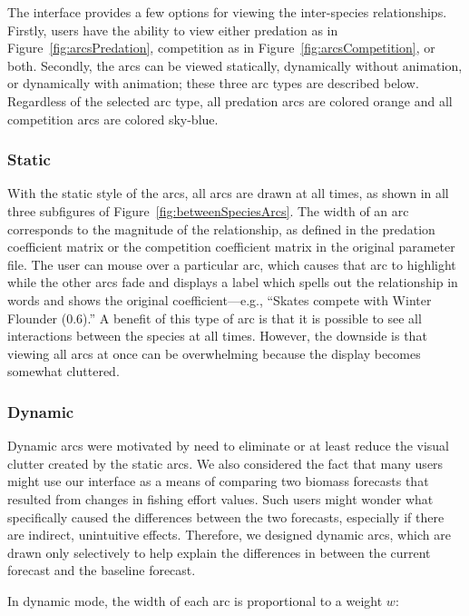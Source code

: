 The interface provides a few options for viewing the inter-species relationships.  Firstly, users have the ability to view either predation as in Figure~\ref{fig:arcsPredation}, competition as in Figure~\ref{fig:arcsCompetition}, or both.  Secondly, the arcs can be viewed statically, dynamically without animation, or dynamically with animation; these three arc types are described below.  Regardless of the selected arc type, all predation arcs are colored orange and all competition arcs are colored sky-blue.

\subsubsection{Static}

With the static style of the arcs, all arcs are drawn at all times, as shown in all three subfigures of Figure~\ref{fig:betweenSpeciesArcs}.  The width of an arc corresponds to the magnitude of the relationship, as defined in the predation coefficient matrix or the competition coefficient matrix in the original parameter file.  The user can mouse over a particular arc, which causes that arc to highlight while the other arcs fade and displays a label which spells out the relationship in words and shows the original coefficient---e.g., ``Skates compete with Winter Flounder (0.6).''  A benefit of this type of arc is that it is possible to see all interactions between the species at all times.  However, the downside is that viewing all arcs at once can be overwhelming because the display becomes somewhat cluttered.

\subsubsection{Dynamic}

Dynamic arcs were motivated by need to eliminate or at least reduce the visual clutter created by the static arcs.  We also considered the fact that many users might use our interface as a means of comparing two biomass forecasts that resulted from changes in fishing effort values.  Such users might wonder what specifically caused the differences between the two forecasts, especially if there are indirect, unintuitive effects.  Therefore, we designed dynamic arcs, which are drawn only selectively to help explain the differences in between the current forecast and the baseline forecast.

In dynamic mode, the width of each arc is proportional to a weight $w$:

